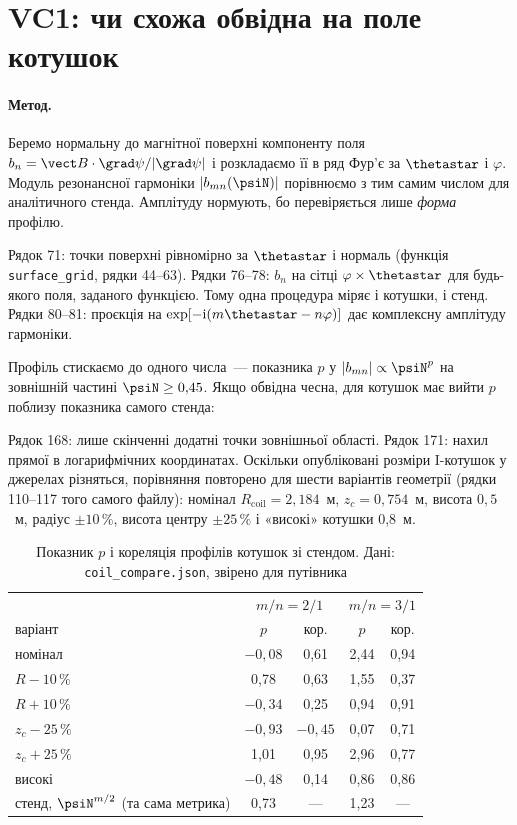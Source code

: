 \section{VC1: чи схожа обвідна на поле котушок}\label{sec:g09-vc1}

\paragraph{Метод.} Беремо нормальну до магнітної поверхні компоненту поля
$b_n=\vect B\cdot\grad\psi/|\grad\psi|$ і розкладаємо її в ряд Фур'є за $\thetastar$ і $\varphi$.
Модуль резонансної гармоніки $|b_{mn}(\psiN)|$ порівнюємо з тим самим числом для аналітичного
стенда. Амплітуду нормують, бо перевіряється лише \emph{форма} профілю.


Рядок 71: точки поверхні рівномірно за $\thetastar$ і нормаль (функція \texttt{surface\_grid},
рядки 44--63). Рядки 76--78: $b_n$ на сітці $\varphi\times\thetastar$ для будь-якого поля, заданого
функцією. Тому одна процедура міряє і котушки, і стенд. Рядки 80--81: проєкція на
$\exp[-\mathrm i(m\thetastar-n\varphi)]$ дає комплексну амплітуду гармоніки.

Профіль стискаємо до одного числа~--- показника $p$ у $|b_{mn}|\propto\psiN^{p}$ на зовнішній
частині $\psiN\ge0{,}45$. Якщо обвідна чесна, для котушок має вийти $p$ поблизу
показника самого стенда:


Рядок 168: лише скінченні додатні точки зовнішньої області. Рядок 171: нахил прямої в
логарифмічних координатах. Оскільки опубліковані розміри I-котушок у джерелах різняться,
порівняння повторено для шести варіантів геометрії (рядки 110--117 того самого файлу): номінал
$R_{\text{coil}}=2{,}184$~м, $z_c=0{,}754$~м, висота $0{,}5$~м, радіус $\pm10\,\%$, висота центру
$\pm25\,\%$ і «високі» котушки 0,8~м.

\begin{table}[ht]
\centering\small
\caption{Показник $p$ і кореляція профілів котушок зі стендом. Дані:
\texttt{coil\_compare.json}, звірено для путівника}
\label{tab:g09-exp}
\begin{tabular}{@{}lcccc@{}}
\toprule
& \multicolumn{2}{c}{$m/n=2/1$} & \multicolumn{2}{c}{$m/n=3/1$}\\
варіант & $p$ & кор. & $p$ & кор.\\
\midrule
номінал & $-0{,}08$ & 0,61 & 2,44 & 0,94\\
$R-10\,\%$ & 0,78 & 0,63 & 1,55 & 0,37\\
$R+10\,\%$ & $-0{,}34$ & 0,25 & 0,94 & 0,91\\
$z_c-25\,\%$ & $-0{,}93$ & $-0{,}45$ & 0,07 & 0,71\\
$z_c+25\,\%$ & 1,01 & 0,95 & 2,96 & 0,77\\
високі & $-0{,}48$ & 0,14 & 0,86 & 0,86\\
\midrule
стенд, $\psiN^{m/2}$ (та сама метрика) & 0,73 & --- & 1,23 & ---\\
\bottomrule
\end{tabular}
\end{table}

